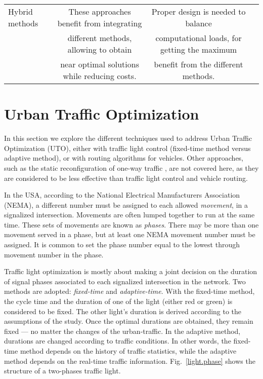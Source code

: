 \documentclass[10pt,onecolumn]{article}
\begin{document}
\begin{table*}[ht]
\begin{tabulary}{0.001\textwidth}{ | l | c| c| c| }
  
   \hline Hybrid methods  	& These approaches benefit from integrating   	& Proper design is needed to balance  	& \cite{Blandin2009, Herring2010}   \\
  			& different methods, allowing to obtain  	& computational loads, for getting the maximum 	& \\
  			& near optimal solutions while reducing costs. & benefit from the different methods.  	& \\

   \hline \hline \end{tabulary} 
\end{table*}




\section{Urban Traffic Optimization} 
\label{uto}

In this section we explore the different techniques used to address Urban Traffic Optimization (UTO), either with traffic light control (fixed-time method versus adaptive method), or with routing algorithms for vehicles.
Other approaches, such as the static reconfiguration of one-way traffic \cite{SalcedoSanz2013}, are not covered here, as they are considered to be less effective than traffic light control and vehicle routing.

In the USA, according to the National Electrical Manufacturers Association (NEMA), a different number must be assigned to each allowed \textit{movement}, in a signalized intersection.
Movements are often lumped together to run at the same time. These sets of movements are known as \textit{phases}. There may be more than one movement served in a phase, but at least one NEMA movement number must be assigned. It is common to set the phase number equal to the lowest through movement number in the phase.

Traffic light optimization is mostly about making a joint decision on the duration of signal phases associated to each signalized intersection in the network. Two methods are adopted: \textit{fixed-time} and \textit{adaptive-time}.
With the fixed-time method, the cycle time and the duration of one of the light (either red or green) is considered to be fixed. 
The other light's duration is derived according to the assumptions of the study. Once the optimal durations are obtained, they remain fixed --- no matter the changes of the urban-traffic.
In the adaptive method, durations are changed according to traffic conditions. In other words, the fixed-time method depends on the history of traffic statistics, while the adaptive method depends on the real-time traffic information.
Fig.~\ref{light.phase} shows the structure of a two-phases traffic light.
\end{document}

